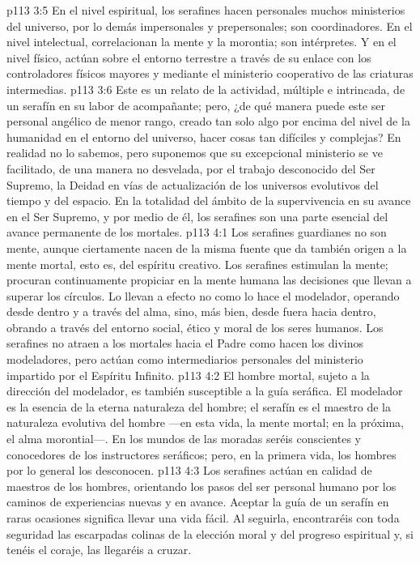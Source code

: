 \vs p113 3:5 En el nivel espiritual, los serafines hacen personales muchos ministerios del universo, por lo demás impersonales y prepersonales; son coordinadores. En el nivel intelectual, correlacionan la mente y la morontia; son intérpretes. Y en el nivel físico, actúan sobre el entorno terrestre a través de su enlace con los controladores físicos mayores y mediante el ministerio cooperativo de las criaturas intermedias.
\vs p113 3:6 Este es un relato de la actividad, múltiple e intrincada, de un serafín en su labor de acompañante; pero, ¿de qué manera puede este ser personal angélico de menor rango, creado tan solo algo por encima del nivel de la humanidad en el entorno del universo, hacer cosas tan difíciles y complejas? En realidad no lo sabemos, pero suponemos que su excepcional ministerio se ve facilitado, de una manera no desvelada, por el trabajo desconocido del Ser Supremo, la Deidad en vías de actualización de los universos evolutivos del tiempo y del espacio. En la totalidad del ámbito de la supervivencia en su avance en el Ser Supremo, y por medio de él, los serafines son una parte esencial del avance permanente de los mortales.
\vs p113 4:1 Los serafines guardianes no son mente, aunque ciertamente nacen de la misma fuente que da también origen a la mente mortal, esto es, del espíritu creativo. Los serafines estimulan la mente; procuran continuamente propiciar en la mente humana las decisiones que llevan a superar los círculos. Lo llevan a efecto no como lo hace el modelador, operando desde dentro y a través del alma, sino, más bien, desde fuera hacia dentro, obrando a través del entorno social, ético y moral de los seres humanos. Los serafines no atraen a los mortales hacia el Padre como hacen los divinos modeladores, pero actúan como intermediarios personales del ministerio impartido por el Espíritu Infinito.
\vs p113 4:2 El hombre mortal, sujeto a la dirección del modelador, es también susceptible a la guía seráfica. El modelador es la esencia de la eterna naturaleza del hombre; el serafín es el maestro de la naturaleza evolutiva del hombre ---en esta vida, la mente mortal; en la próxima, el alma morontial---. En los mundos de las moradas seréis conscientes y conocedores de los instructores seráficos; pero, en la primera vida, los hombres por lo general los desconocen.
\vs p113 4:3 Los serafines actúan en calidad de maestros de los hombres, orientando los pasos del ser personal humano por los caminos de experiencias nuevas y en avance. Aceptar la guía de un serafín en raras ocasiones significa llevar una vida fácil. Al seguirla, encontraréis con toda seguridad las escarpadas colinas de la elección moral y del progreso espiritual y, si tenéis el coraje, las llegaréis a cruzar.
